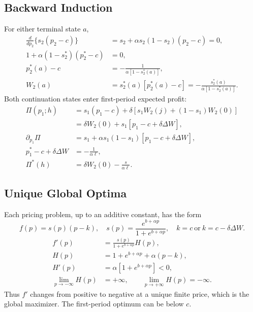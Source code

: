 \documentclass[12pt]{article}
\theoremstyle{definition}
\theoremstyle{remark}
\begin{document}
\subsection{Backward Induction}
For either terminal state $a$,
\begin{align}
 \frac{d}{dp_2}\{s_2(p_2-c)\}
 &=s_2+\alpha s_2(1-s_2)(p_2-c)=0,\\
 1+\alpha(1-s_2^*)(p_2^*-c)&=0,\\
 p_2^*(a)-c&=-\frac{1}{\alpha[1-s_2^*(a)]},\\
 W_2(a)&=s_2^*(a)[p_2^*(a)-c]
 =-\frac{s_2^*(a)}{\alpha[1-s_2^*(a)]}.
\end{align}
Both continuation states enter first-period expected profit:
\begin{align}
 \Pi(p_1;h)&=s_1(p_1-c)+\delta[s_1W_2(j)+(1-s_1)W_2(0)]\\
 &=\delta W_2(0)+s_1[p_1-c+\delta\Delta W],\\
 \partial_{p_1}\Pi
 &=s_1+\alpha s_1(1-s_1)[p_1-c+\delta\Delta W],\\
 p_1^*-c+\delta\Delta W&=-\frac{1}{\alpha\ell},\\
 \Pi^*(h)&=\delta W_2(0)-\frac{s}{\alpha\ell}.
\end{align}

\subsection{Unique Global Optima}
Each pricing problem, up to an additive constant, has the form
\begin{equation}
 f(p)=s(p)(p-k),\quad s(p)=\frac{e^{b+\alpha p}}{1+e^{b+\alpha p}},
 \quad k=c\ \text{or}\ k=c-\delta\Delta W.
\end{equation}
\begin{align}
 f'(p)&=\frac{s(p)}{1+e^{b+\alpha p}}H(p),\\
 H(p)&=1+e^{b+\alpha p}+\alpha(p-k),\\
 H'(p)&=\alpha[1+e^{b+\alpha p}]<0,\\
 \lim_{p\to-\infty}H(p)&=+\infty,\qquad
 \lim_{p\to+\infty}H(p)=-\infty.
\end{align}
Thus $f'$ changes from positive to negative at a unique finite price,
which is the global maximizer. The first-period optimum can be below $c$.
\end{document}
